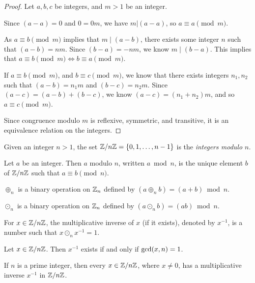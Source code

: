 \begin{proof} Let $a, b, c$ be integers, and $m > 1$ be an integer.

    Since $(a-a) = 0$ and $0 = 0m$, we have $m|(a-a)$, so $a \equiv a \pmod m$.

    As $a \equiv b \pmod m$ implies that $m\mid(a - b)$, there exists some integer $n$ such that $(a - b) = nm$. Since $(b - a) = -nm$, we know $m\mid(b-a)$. This implies that $a \equiv b \pmod m \iff b \equiv a \pmod m$.

    If $a \equiv b \pmod m$, and $b \equiv c \pmod m$, we know that there exists integers $n_1, n_2$ such that $(a-b) = n_1m$ and $(b-c) = n_2m$. Since $(a-c) = (a-b) + (b-c)$, we know $(a-c) = (n_1 + n_2)m$, and so $a \equiv c \pmod m$.

    Since congruence modulo $m$ is reflexive, symmetric, and transitive, it is an equivalence relation on the integers.
\end{proof}

\begin{defn}\label{mod-n}
    Given an integer $n > 1$, the set $\mathbb{Z}/n\mathbb{Z} = \{0, 1, \ldots, n-1\}$ is the \emph{integers modulo $n$}.
\end{defn}

\begin{defn}\label{modulo}
    Let $a$ be an integer. Then $a$ modulo $n$, written $a \bmod n$, is the unique element $b$ of $\mathbb{Z}/n\mathbb{Z}$ such that $a \equiv b \pmod n$.
\end{defn}

\begin{defn}
    $\oplus_n$ is a binary operation on $\mathbb{Z}_n$ defined by $(a \oplus_n b) = (a + b)\bmod n$.
\end{defn}

\begin{defn}
    $\odot_n$ is a binary operation on $\mathbb{Z}_n$ defined by $(a \odot_n b) = (ab)\bmod n$.
\end{defn}

\begin{defn}
    For $x \in \mathbb{Z}/n\mathbb{Z}$, the multiplicative inverse of $x$ (if it exists), denoted by $x^{-1}$, is a number such that $x \odot_n x^{-1} = 1$.
\end{defn}

\begin{prop}
    Let $x \in \mathbb{Z}/n\mathbb{Z}$. Then $x^{-1}$ exists if and only if $\operatorname{gcd}(x, n) = 1$.
\end{prop}

\begin{thm}\label{znz-prime-field}
    If $n$ is a prime integer, then every $x \in \mathbb{Z}/n\mathbb{Z}$, where $x \neq 0$, has a multiplicative inverse $x^{-1}$ in $\mathbb{Z}/n\mathbb{Z}$.
\end{thm}

